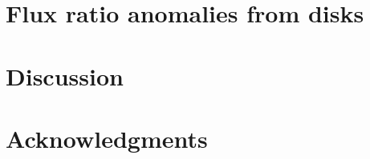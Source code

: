\documentclass[useAMS,usenatbib]{mn2e}
\begin{document}
\section{Flux ratio anomalies from disks}

\section{Discussion}
\section*{Acknowledgments}







\label{lastpage}
\end{document}
